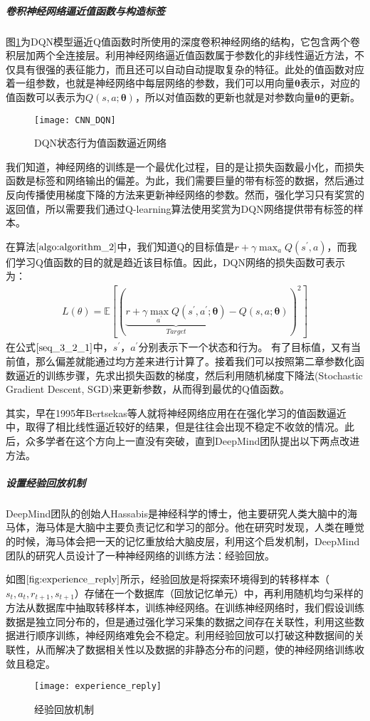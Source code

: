  \subparagraph{卷积神经网络逼近值函数与构造标签}
图\ref{fig:CNN_DQN}为DQN模型逼近Q值函数时所使用的深度卷积神经网络的结构，它包含两个卷积层加两个全连接层。利用神经网络逼近值函数属于参数化的非线性逼近方法，不仅具有很强的表征能力，而且还可以自动自动提取复杂的特征。此处的值函数对应着一组参数，也就是神经网络中每层网络的参数，我们可以用向量$\bm{\theta}$表示，对应的值函数可以表示为$Q(s,a;\bm{\theta})$，所以对值函数的更新也就是对参数向量$\bm{\theta}$的更新。
\begin{figure}[htbp]
\centering
\texttt{[image: CNN\_DQN]}
\caption{DQN状态行为值函数逼近网络}
\label{fig:CNN_DQN}
\end{figure}

我们知道，神经网络的训练是一个最优化过程，目的是让损失函数最小化，而损失函数是标签和网络输出的偏差。为此，我们需要巨量的带有标签的数据，然后通过反向传播使用梯度下降的方法来更新神经网络的参数。然而，强化学习只有奖赏的返回值，所以需要我们通过Q-learning算法使用奖赏为DQN网络提供带有标签的样本。

在算法$\ref{algo:algorithm_2}$中，我们知道Q的目标值是$r+\gamma \max_{a}Q(s^{'},a)$，而我们学习Q值函数的目的就是趋近该目标值。因此，DQN网络的损失函数可表示为：
\begin{equation}
\label{seq_3_2_1}
\begin{aligned}
L(\theta)=\mathbb{E}[(\underbrace{r+\gamma\max_{a^{'}} Q(s^{'},a^{'};\bm{\theta})}_{Target}-Q(s,a;\bm{\theta}))^{2}]
\end{aligned}
\end{equation}
在公式$\eqref{seq_3_2_1}$中，$s^{'}$，$a^{'}$分别表示下一个状态和行为。
有了目标值，又有当前值，那么偏差就能通过均方差来进行计算了。接着我们可以按照第二章参数化函数逼近的训练步骤，先求出损失函数的梯度，然后利用随机梯度下降法(Stochastic Gradient Descent, SGD)来更新参数，从而得到最优的Q值函数。

其实，早在1995年Bertsekas等人就将神经网络应用在在强化学习的值函数逼近中，取得了相比线性逼近较好的结果，但是往往会出现不稳定不收敛的情况\citep{bertsekas1995neuro}。此后，众多学者在这个方向上一直没有突破，直到DeepMind团队提出以下两点改进方法。

 \subparagraph{设置经验回放机制}
DeepMind团队的创始人Hassabis是神经科学的博士，他主要研究人类大脑中的海马体，海马体是大脑中主要负责记忆和学习的部分。他在研究时发现，人类在睡觉的时候，海马体会把一天的记忆重放给大脑皮层，利用这个启发机制，DeepMind团队的研究人员设计了一种神经网络的训练方法：经验回放。

如图$\ref{fig:experience_reply}$所示，经验回放是将探索环境得到的转移样本（$s_{t}, a_{t}, r_{t+1}, s_{t+1}$）存储在一个数据库（回放记忆单元）中，再利用随机均匀采样的方法从数据库中抽取转移样本，训练神经网络。在训练神经网络时，我们假设训练数据是独立同分布的，但是通过强化学习采集的数据之间存在关联性，利用这些数据进行顺序训练，神经网络难免会不稳定。利用经验回放可以打破这种数据间的关联性，从而解决了数据相关性以及数据的非静态分布的问题，使的神经网络训练收敛且稳定。
\begin{figure}[htbp]
\centering
\texttt{[image: experience\_reply]}
\caption{经验回放机制}
\label{fig:experience_reply}
\end{figure}

